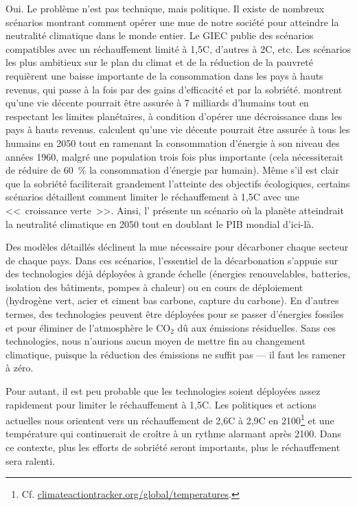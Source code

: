 \documentclass[a5paper,french,openany]{memoir}
\begin{document}
Oui. Le problème n'est pas technique, mais politique. Il existe de nombreux scénarios montrant comment opérer une mue de notre société pour atteindre la neutralité climatique dans le monde entier. Le GIEC publie des scénarios compatibles avec un réchauffement limité à 1,5\textdegree{}C, d'autres à 2\textdegree{}C, etc. Les scénarios les plus ambitieux sur le plan du climat et de la réduction de la pauvreté requièrent une baisse importante de la consommation dans les pays à hauts revenus, qui passe à la fois par des gains d'efficacité et par la sobriété. \cite{oneill_good_2018,hickel_is_2019} montrent qu'une vie décente pourrait être assurée à 7 milliards d'humains tout en respectant les limites planétaires, à condition d'opérer une décroissance dans les pays à hauts revenus. \cite{millward-hopkins_providing_2020} calculent qu'une vie décente pourrait être assurée à tous les humains en 2050 tout en ramenant la consommation d'énergie à son niveau des années 1960, malgré une population trois fois plus importante (cela nécessiterait de réduire de 60~\% la consommation d'énergie par humain). Même s'il est clair que la sobriété faciliterait grandement l'atteinte des objectifs écologiques, certains scénarios détaillent comment limiter le réchauffement à 1,5\textdegree{}C avec une <<~croissance verte~>>. Ainsi, l'\cite{agence_internationale_de_lenergie_net_2023} présente un scénario où la planète atteindrait la neutralité climatique en 2050 tout en doublant le PIB mondial d'ici-là. 

Des modèles détaillés déclinent la mue nécessaire pour décarboner chaque secteur de chaque pays. Dans ces scénarios, l'essentiel de la décarbonation s'appuie sur des technologies déjà déployées à grande échelle (énergies renouvelables, batteries, isolation des bâtiments, pompes à chaleur) ou en cours de déploiement (hydrogène vert, acier et ciment bas carbone, capture du carbone). En d'autres termes, des technologies peuvent être déployées pour se passer d'énergies fossiles et pour éliminer de l'atmosphère le CO$_\text{2}$ dû aux émissions résiduelles. Sans ces technologies, nous n'aurions aucun moyen de mettre fin au changement climatique, puisque la réduction des émissions ne suffit pas --- il faut les ramener à zéro. 

Pour autant, il est peu probable que les technologies soient déployées assez rapidement pour limiter le réchauffement à 1,5\textdegree{}C. Les politiques et actions 
actuelles nous orientent vers un réchauffement de 2,6\textdegree{}C à 2,9\textdegree{}C en 2100\footnote{Cf. \href{https://climateactiontracker.org/global/temperatures/}{climateactiontracker.org/global/temperatures}.} et une température qui continuerait de croître à un rythme alarmant après 2100. Dans ce contexte, plus les efforts de sobriété seront importants, plus le réchauffement sera ralenti. 
\end{document}
